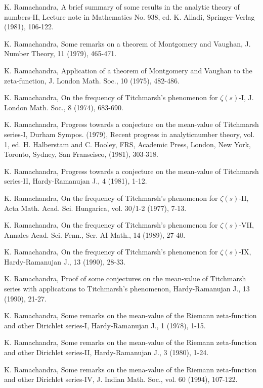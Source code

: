 \begin{thebibliography}{99}
 K. Ramachandra, A brief summary of some results in the analytic theory of numbers-II, Lecture note in Mathematics No. 938, ed. K. Alladi, Springer-Verlag (1981), 106-122.

 K. Ramachandra, Some remarks on a theorem of Montgomery and Vaughan, J. Number Theory, 11 (1979), 465-471.

 K. Ramachandra, Application of a theorem of Montgomery and Vaughan to the zeta-function, J. London Math. Soc., 10 (1975), 482-486.

 K. Ramachandra, On the frequency of Titchmarsh's phenomenon for $\zeta(s)$-I, J. London Math. Soc., 8 (1974), 683-690.

 K. Ramachandra, Progress towards a conjecture on the mean-value of Titchmarsh series-I, Durham Sympos. (1979), Recent progress in analytic\pageoriginale number theory, vol. 1, ed. H. Halberstam and C. Hooley, FRS, Academic Press, London, New York, Toronto, Sydney, San Franscisco, (1981), 303-318.

 K. Ramachandra, Progress towards a conjecture on the mean-value of Titchmarsh series-II, Hardy-Ramanujan J., 4 (1981), 1-12.

 K. Ramachandra, On the frequency of Titchmarsh's phenomenon for $\zeta(s)$-II, Acta Math. Acad. Sci. Hungarica, vol. 30/1-2 (1977), 7-13.

 K. Ramachandra, On the frequency of Titchmarsh's phenomenon for $\zeta(s)$-VII, Annales Acad. Sci. Fenn., Ser. AI Math., 14 (1989), 27-40.

 K. Ramachandra, On the frequency of Titchmarsh's phenomenon for $\zeta(s)$-IX, Hardy-Ramanujan J., 13 (1990), 28-33.

 K. Ramachandra, Proof of some conjectures on the mean-value of Titchmarsh series with applications to Titchmarsh's phenomenon, Hardy-Ramanujan J., 13 (1990), 21-27.

 K. Ramachandra, Some remarks on the mean-value of the Riemann zeta-function and other Dirichlet series-I, Hardy-Ramanujan J., 1 (1978), 1-15.

 K. Ramachandra, Some remarks on the mean-value of the Riemann zeta-function and other Dirichlet series-II, Hardy-Ramanujan J., 3 (1980), 1-24.

 K. Ramachandra, Some remarks on the mena-value of the Riemann zeta-function and other Dirichlet series-IV, J. Indian Math. Soc., vol. 60 (1994), 107-122. 


\end{thebibliography}
